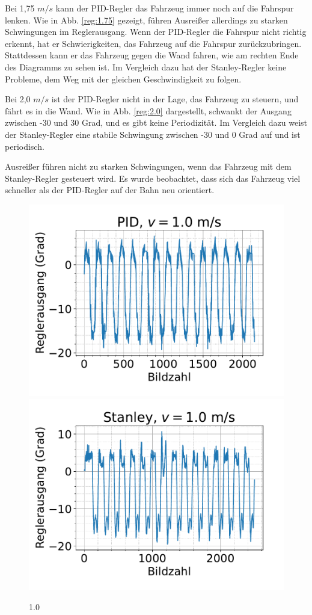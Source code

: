 \documentclass[arbeit=studie,oneside,BCOR=12mm]{ArbeitRST}
\begin{document}
Bei 1,75 $m/s$ kann der PID-Regler das Fahrzeug immer noch auf die Fahrspur
lenken. Wie in Abb. \ref{reg:1.75} gezeigt, führen Ausreißer allerdings zu starken
Schwingungen im Reglerausgang. Wenn der PID-Regler die Fahrspur nicht richtig
erkennt, hat er Schwierigkeiten, das Fahrzeug auf die Fahrspur zurückzubringen.
Stattdessen kann er das Fahrzeug gegen die Wand fahren, wie am rechten Ende des
Diagramms zu sehen ist. Im Vergleich dazu hat der Stanley-Regler keine
Probleme, dem Weg mit der gleichen Geschwindigkeit zu folgen.

Bei 2,0 $m/s$ ist der PID-Regler nicht in der Lage, das Fahrzeug zu steuern, und
fährt es in die Wand. Wie in Abb. \ref{reg:2.0} dargestellt, schwankt der Ausgang
zwischen -30 und 30 Grad, und es gibt keine Periodizität. Im Vergleich dazu
weist der Stanley-Regler eine stabile Schwingung zwischen -30 und 0 Grad auf
und ist periodisch.

Ausreißer führen nicht zu starken Schwingungen, wenn das Fahrzeug mit dem
Stanley-Regler gesteuert wird. Es wurde beobachtet, dass sich das Fahrzeug viel
schneller als der PID-Regler auf der Bahn neu orientiert.

\begin{figure}[h]
    \centering
    \includegraphics[scale=0.47]{pid1.0}
    \includegraphics[scale=0.47]{Stan1.0}
    \caption{1.0}
    \label{reg:1.0}
\end{figure}
\end{document}
